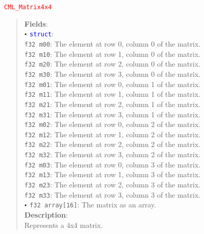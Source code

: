 \documentclass[a4paper,oneside,8pt]{extarticle}
\newcommand{\union}[1]{
  \noindent\textcolor{red}{\texttt{#1}}
  \vspace{-0.3em}
}
\renewcommand{\dot}{\raisebox{0.3ex}{\scalebox{0.6}{$\bullet$}}}
\theoremstyle{definition}
\begin{document}
\union{CML\_Matrix4x4}
\begin{quote}
  \textbf{Fields}: \\
  $\dot$ \textcolor{blue}{\texttt{struct}}: \\
  \indent\hspace{1em} \texttt{f32 m00}: The element at row 0, column 0 of the matrix. \\
  \indent\hspace{1em} \texttt{f32 m10}: The element at row 1, column 0 of the matrix. \\
  \indent\hspace{1em} \texttt{f32 m20}: The element at row 2, column 0 of the matrix. \\
  \indent\hspace{1em} \texttt{f32 m30}: The element at row 3, column 0 of the matrix. \\
  \indent\hspace{1em} \texttt{f32 m01}: The element at row 0, column 1 of the matrix. \\
  \indent\hspace{1em} \texttt{f32 m11}: The element at row 1, column 1 of the matrix. \\
  \indent\hspace{1em} \texttt{f32 m21}: The element at row 2, column 1 of the matrix. \\
  \indent\hspace{1em} \texttt{f32 m31}: The element at row 3, column 1 of the matrix. \\
  \indent\hspace{1em} \texttt{f32 m02}: The element at row 0, column 2 of the matrix. \\
  \indent\hspace{1em} \texttt{f32 m12}: The element at row 1, column 2 of the matrix. \\
  \indent\hspace{1em} \texttt{f32 m22}: The element at row 2, column 2 of the matrix. \\
  \indent\hspace{1em} \texttt{f32 m32}: The element at row 3, column 2 of the matrix. \\
  \indent\hspace{1em} \texttt{f32 m03}: The element at row 0, column 3 of the matrix. \\
  \indent\hspace{1em} \texttt{f32 m13}: The element at row 1,
  column 3 of the matrix. \\
  \indent\hspace{1em} \texttt{f32 m23}: The element at row 2, column 3 of the matrix. \\
  \indent\hspace{1em} \texttt{f32 m33}: The element at row 3, column 3 of the matrix. \\
  $\dot$ \texttt{f32 array[16]}: The matrix as an array. \\

  \vspace{-0.75em}
  \textbf{Description}: \\
  Represents a 4x4 matrix. \\
\end{quote}
\end{document}
